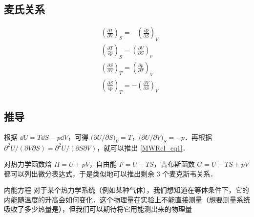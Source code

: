 

\subsection{麦氏关系}

\begin{align}
&\left(\frac{\partial T}{\partial V}\right)_S=-\left(\frac{\partial p}{\partial S}\right)_V\label{MWRel_eq1}
\\
&\left(\frac{\partial T}{\partial p}\right)_S=\left(\frac{\partial V}{\partial S}\right)_p
\\
&\left(\frac{\partial S}{\partial V}\right)_T=\left(\frac{\partial p}{\partial T}\right)_V
\\
&\left(\frac{\partial S}{\partial p}\right)_T=-\left(\frac{\partial V}{\partial S}\right)_V
\end{align}

\subsection{推导}
根据 $\dd U=T\dd S-p\dd V$，可得 $\Big(\partial U/\partial S\Big)_V=T$，$\Big(\partial U/\partial V\Big)_S=-p$．再根据 $\partial^2 U/(\partial V\partial S)=\partial^2 U/(\partial S\partial V)$，就可以推出 \autoref{MWRel_eq1}．

对热力学函数焓 $H=U+pV$，自由能 $F=U-TS$，吉布斯函数 $G=U-TS+pV$ 都可以列出微分表达式，于是类似地可以推出剩余 $3$ 个麦克斯韦关系．

\begin{example}{内能方程}
对于某个热力学系统（例如某种气体），我们想知道在等体条件下，它的内能随温度的升高会如何变化．这个物理量在实验上不能直接测量（想要测量系统吸收了多少热量是），但我们可以期待将它用能测出来的物理量
\end{example}
